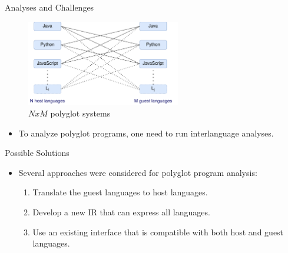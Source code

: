 \begin{frame}
    \centering
    \textbf{}
\end{frame}

\begin{frame}{Analyses and Challenges}
    \begin{figure}[h]
        \centering
        \includegraphics[width=0.6\textwidth]{images/nxm analyses}
        \caption{$NxM$ polyglot systems}
        \label{fig:figure}
    \end{figure}
    \begin{itemize}
        \item To analyze polyglot programs, one need to run interlanguage analyses.
    \end{itemize}
\end{frame}

\begin{frame}{Possible Solutions}
    \begin{itemize}
        \item Several approaches were considered for polyglot program analysis:
        \begin{enumerate}
            \vspace{3mm}
            \item Translate the guest languages to host languages.
            \vspace{3mm}
            \item Develop a new IR that can express all languages.
            \vspace{3mm}
            \item Use an existing interface that is compatible with both host and guest languages.
        \end{enumerate}
    \end{itemize}
\end{frame}


